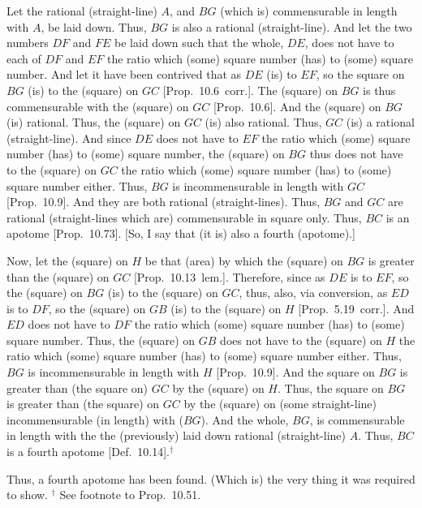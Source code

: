 Let the rational (straight-line) $A$, and $BG$ (which is)
commensurable in length with $A$, be laid down.
Thus, $BG$ is also a rational (straight-line). And let the two numbers $DF$
and $FE$ be laid down such that the whole, $DE$, does not have to
each of $DF$ and $EF$ the ratio which (some) square number (has)
to (some) square number. And let it have been contrived that as $DE$
(is) to $EF$, so the square on $BG$ (is) to the (square) on $GC$
[Prop.~10.6~corr.]. The (square) on $BG$ is
thus commensurable with the (square) on $GC$ [Prop.~10.6]. And the (square) on $BG$ (is)
rational. Thus, the (square) on $GC$ (is) also rational. Thus, $GC$
(is) a rational (straight-line). And since $DE$ does not have to $EF$
the ratio which (some) square number (has) to (some) square number,
the (square) on $BG$ thus does not have to the (square) on $GC$ the
ratio which (some) square number (has) to (some) square number either.
Thus, $BG$ is incommensurable in length with $GC$ [Prop.~10.9]. And they are both rational (straight-lines). Thus, $BG$ and $GC$ are rational (straight-lines which are)
commensurable in square only. Thus, $BC$ is an apotome [Prop.~10.73]. [So, I say that
(it is) also a fourth (apotome).]

Now, let the (square) on $H$ be that (area) by which the (square)
on $BG$ is greater than the (square) on $GC$ [Prop.~10.13~lem.]. Therefore, since as
$DE$ is to $EF$, so the (square) on $BG$ (is) to the (square)
on $GC$, thus, also, via conversion, as $ED$ is to $DF$, so the
(square) on $GB$ (is) to the (square) on $H$ [Prop.~5.19~corr.]. And $ED$ does not have to
$DF$ the ratio which (some) square number (has) to (some) square number.
Thus, the (square) on $GB$ does not have to the (square) on $H$
the ratio which (some) square number (has) to (some) square number either.
Thus, $BG$ is incommensurable in length with $H$ [Prop.~10.9]. And the square on $BG$ is greater
than (the square on) $GC$ by the (square) on $H$. Thus, the
square on $BG$ is greater than (the square) on $GC$ by the (square)
on (some straight-line) incommensurable (in length) with ($BG$). And the whole,
$BG$, is commensurable in length with the the (previously) laid
down rational (straight-line) $A$. Thus, $BC$ is a fourth apotome
[Def.~10.14].$^\dag$

Thus, a fourth apotome has been found. (Which is) the very thing it was required to show.
{\footnotesize\noindent$^\dag$ See footnote to Prop.~10.51.}


